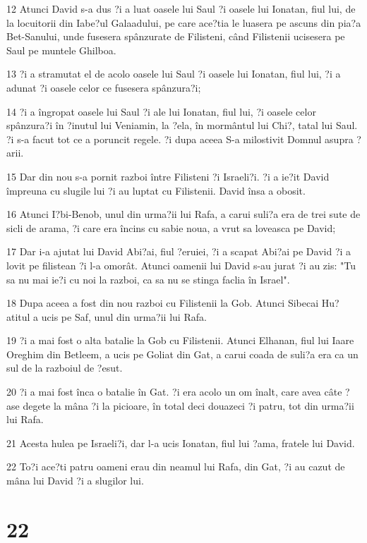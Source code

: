 \par 12 Atunci David s-a dus ?i a luat oasele lui Saul ?i oasele lui Ionatan, fiul lui, de la locuitorii din Iabe?ul Galaadului, pe care ace?tia le luasera pe ascuns din pia?a Bet-Sanului, unde fusesera spânzurate de Filisteni, când Filistenii ucisesera pe Saul pe muntele Ghilboa.
\par 13 ?i a stramutat el de acolo oasele lui Saul ?i oasele lui Ionatan, fiul lui, ?i a adunat ?i oasele celor ce fusesera spânzura?i;
\par 14 ?i a îngropat oasele lui Saul ?i ale lui Ionatan, fiul lui, ?i oasele celor spânzura?i în ?inutul lui Veniamin, la ?ela, în mormântul lui Chi?, tatal lui Saul. ?i s-a facut tot ce a poruncit regele. ?i dupa aceea S-a milostivit Domnul asupra ?arii.
\par 15 Dar din nou s-a pornit razboi între Filisteni ?i Israeli?i. ?i a ie?it David împreuna cu slugile lui ?i au luptat cu Filistenii. David însa a obosit.
\par 16 Atunci I?bi-Benob, unul din urma?ii lui Rafa, a carui suli?a era de trei sute de sicli de arama, ?i care era încins cu sabie noua, a vrut sa loveasca pe David;
\par 17 Dar i-a ajutat lui David Abi?ai, fiul ?eruiei, ?i a scapat Abi?ai pe David ?i a lovit pe filistean ?i l-a omorât. Atunci oamenii lui David s-au jurat ?i au zis: "Tu sa nu mai ie?i cu noi la razboi, ca sa nu se stinga faclia în Israel".
\par 18 Dupa aceea a fost din nou razboi cu Filistenii la Gob. Atunci Sibecai Hu?atitul a ucis pe Saf, unul din urma?ii lui Rafa.
\par 19 ?i a mai fost o alta batalie la Gob cu Filistenii. Atunci Elhanan, fiul lui Iaare Oreghim din Betleem, a ucis pe Goliat din Gat, a carui coada de suli?a era ca un sul de la razboiul de ?esut.
\par 20 ?i a mai fost înca o batalie în Gat. ?i era acolo un om înalt, care avea câte ?ase degete la mâna ?i la picioare, în total deci douazeci ?i patru, tot din urma?ii lui Rafa.
\par 21 Acesta hulea pe Israeli?i, dar l-a ucis Ionatan, fiul lui ?ama, fratele lui David.
\par 22 To?i ace?ti patru oameni erau din neamul lui Rafa, din Gat, ?i au cazut de mâna lui David ?i a slugilor lui.

\chapter{22}

